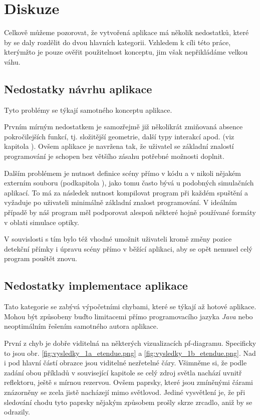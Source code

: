 \chapter{Diskuze}

Celkově můžeme pozorovat, že vytvořená aplikace má několik nedostatků, které by se daly rozdělit do dvou hlavních kategorii. Vzhledem k cíli této práce, kterýmžto je pouze ověřit použitelnost konceptu, jim však nepřikládáme velkou váhu.

\section{Nedostatky návrhu aplikace}

Tyto problémy se týkají samotného konceptu aplikace.

Prvním mírným nedostatkem je samozřejmě již několikrát zmiňovaná absence pokročilejších funkcí, tj. složitější geometrie, další typy interakcí apod. (viz kapitola ). Ovšem aplikace je navržena tak, že uživatel se základní znalostí programování je schopen bez většího zásahu potřebné možnosti doplnit.

Dalším problémem je nutnost definice scény přímo v kódu a v nikoli nějakém externím souboru (podkapitola ), jako tomu často bývá u podobných simulačních aplikací. To má za následek nutnost kompilovat program při každém spuštění a vyžaduje po uživateli minimálně základní znalost programování. V ideálním případě by náš program měl podporovat alespoň některé hojně používané formáty v oblati simulace optiky.

V souvislosti s tím bylo též vhodné umožnit uživateli kromě změny pozice detekční přímky i úpravu scény přímo v běžící aplikaci, aby se opět nemusel celý program pouštět znovu.

\section{Nedostatky implementace aplikace}

Tato kategorie se zabývá výpočetními chybami, které se týkají až hotové aplikace. Mohou být způsobeny buďto limitacemi přímo programovacího jazyka \emph{Java} nebo neoptimálním řešením samotného autora aplikace.

První z chyb je dobře viditelná na některých vizualizacích pf-diagramu. Specificky to jsou obr. \ref{fig:vysledky_1a_etendue.png} a \ref{fig:vysledky_1b_etendue.png}. Nad i pod hlavní částí obrazce jsou viditelné nezřetelné čáry. Všimněme si, že podle zadání obou příkladů v související kapitole  se celý zdroj světla nachází uvnitř reflektoru, ještě s mírnou rezervou. Ovšem paprsky, které jsou zmíněnými čárami znázorněny se zcela jistě nacházejí mimo světlovod. Jediné vysvětlení je, že při sledování chodu tyto paprsky nějakým způsobem prošly skrze zrcadlo, aniž by se odrazily.

